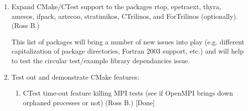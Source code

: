 \documentclass[pdf,ps2pdf,11pt]{SANDreport}
\begin{document}
\begin{enumerate}
\begin{enumerate}
  {}\item Test installing Trilinos heades and libraries and create
  same structure as existing Trilinos system (Ross B.)

  {}\item Implement automatic dependancy tracking facility for
  required and optional dependancies and recursive enables and
  disables (Ross B.)

  {}\item Implement and demonstrate the generation of export makefiles
  in the same exact way the current autotools system
  does\footnote{Specifically requested by Mike Heroux and Roger
  Pawloski} (Ross B.)

  {}\item Get a CDash dashboard up and running controled by Trilinos
  developers and get nightly testing with a cron scirpt going. (Esteban G.)

  {}\item Add Windows and MAC nightly testing for Trilinos/CMake. (Esteban G.)

  {}\item (Low priority) Make the default 'make' target just build
  libraries and add 'tests' and 'examples' targets just like the
  current autotools system does (Ross B.)

  {}\item (Low priority) Implement two-state configuration and
  building to support circular dependancies between tests/examples and
  up-stream libraries.  Test this in a superficial way?

  \end{enumerate}

{}\item Expand CMake/CTest support to the packages rtop, epetraext,
thyra, amesos, ifpack, aztecoo, stratimikos, CTrilinos, and
ForTrilinos (optionally). (Ross B.)

This list of packages will bring a number of new issues into play
(e.g. different capitalization of package directories, Fortran 2003
support, etc.)  and will help to test the circular test/example
library dependancies issue.

{}\item Test out and demonstrate CMake features:

  \begin{enumerate}

  {}\item CTest time-out feature killing MPI tests (see if OpenMPI
  brings down orphaned processes or not) (Ross B.) [Done]


\end{enumerate}
\end{enumerate}
\end{document}

